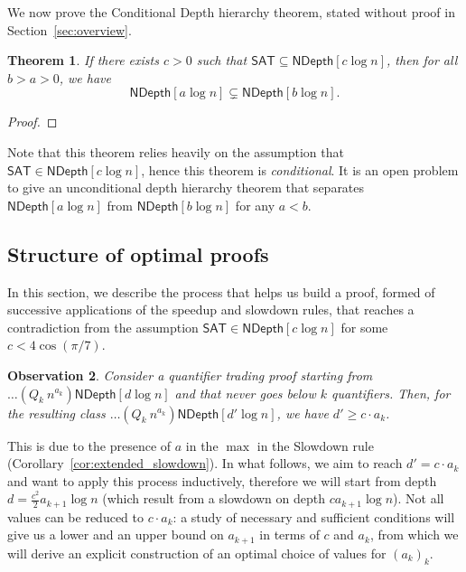 \documentclass[a4paper, 11pt]{article}
\theoremstyle{plain}
\newtheorem{theorem}{Theorem}[section] %
\newtheorem{observation}[theorem]{Observation}
\theoremstyle{definition}
\theoremstyle{remark}
\newcommand{\SAT}{\textsf{SAT}}%
\newcommand{\ND}{\textsf{NDepth}}%
\newcommand{\NDL}[1]{\ND\left[ #1 \log n\right]}%
\begin{document}
We now prove the Conditional Depth hierarchy theorem, 
stated without proof in Section~\ref{sec:overview}.
\begin{theorem}
	If there exists $c > 0$ such that $\SAT \subseteq \NDL{c}$, 
	then for all $b > a > 0$, we have
	\[\NDL{a} \subsetneq \NDL{b}.\] 
\end{theorem}
\begin{proof}
	
\end{proof}

Note that this theorem relies heavily on the assumption that $\SAT\in\NDL{c}$,
hence this theorem is \textit{conditional}.
It is an open problem to give an unconditional depth hierarchy theorem that 
separates $\NDL{a}$ from $\NDL{b}$ for any $a < b$.

\subsection{Structure of optimal proofs}
In this section, we describe
the process that helps us build a proof, formed of successive applications
of the speedup and slowdown rules, 
that reaches a contradiction from the assumption
$\SAT\in\NDL{c}$ for some $c < 4\cos(\pi /7)$.

\begin{observation}
	Consider a quantifier trading proof starting from $\ldots (Q_k~n^{a_k})\NDL{d}$
	and that never goes below $k$ quantifiers.
	Then, for the resulting class $\ldots (Q_k~n^{a_k})\NDL{d'}$, we have $d' \ge c\cdot a_k$.
\end{observation}
This is due to the presence of $a$ in the $\max$ in the Slowdown 
rule (Corollary~\ref{cor:extended_slowdown}).
In what follows, we aim to reach $d' = c\cdot a_k$ 
and want to apply this process inductively,
therefore we will start from depth $d = \frac{c^2}{2}a_{k+1}\log n$
(which result from a slowdown on depth $ca_{k+1}\log n$).
Not all values can be reduced to $c\cdot a_k$: 
a study of necessary and sufficient conditions
will give us a lower and an upper bound on $a_{k+1}$ in terms of $c$ and $a_k$,
from which we will derive an explicit construction of an optimal choice of values for $(a_k)_k$.

\end{document}
